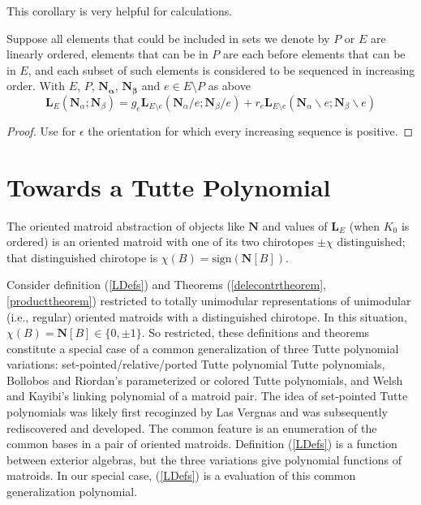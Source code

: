 \documentclass[Unicode]{cedram-alco}
\newcommand{\ext}[1]{\ensuremath{\mathbf{#1}}}
\newcommand{\eNal}{\ensuremath{\ext{N}_{\alpha}}}
\newcommand{\eNbe}{\ensuremath{\ext{N}_\beta}}
\newcommand{\extLHorSub}[3]{\ext{L}_{#1}\left(  {#2}; {#3}  \right)}
\begin{document}
This corollary is very helpful for calculations.

\begin{coro}
  Suppose all elements that could be included in sets we denote by $P$ or $E$ are linearly ordered,
  elements that can be in $P$ are each before elements that can be in $E$,
  and each subset of such elements is considered to be sequenced in increasing order.  With
  $E$, $P$, $\ext{N_\alpha}$, $\ext{N_\beta}$ and $e\in E\setminus P$ as above
  \begin{equation}
       \extLHorSub{E}{\eNal}{\eNbe}=
      g_e\extLHorSub{E\setminus e}{\eNal/e}{\eNbe/e} +
      r_e\extLHorSub{E\setminus e}{\eNal\backslash e}{\eNbe\backslash e}
  \end{equation}
\end{coro}
\begin{proof}
  Use for $\epsilon$ the orientation for which every increasing sequence is positive.
\end{proof}

\section{Towards a Tutte Polynomial}\label{polys}


The oriented matroid abstraction of objects like $\ext{N}$ and values of $\ext{L}_E$
(when $K_0$ is ordered) is an oriented matroid with one of its two chirotopes $\pm \chi$ distinguished; that
distinguished chirotope is $\chi(B) = \text{sign}(\ext{N}[B])$.

Consider definition (\ref{LDefs}) and Theorems (\ref{delecontrtheorem},\ref{producttheorem})
restricted to totally unimodular representations of unimodular (i.e., regular) oriented matroids
with a distinguished chirotope.  In this situation,  $\chi(B) = \ext{N}[B]\in \{0,\pm 1\}$.
So restricted, these definitions and theorems constitute a special case
of a common generalization of three Tutte polynomial variations:
set-pointed/relative/ported Tutte polynomial
Tutte polynomials, 
Bollobos and Riordan's parameterized or colored Tutte polynomials\cite{BollobasRiordanTuttePolyColored},
and Welsh and Kayibi's linking
polynomial of a matroid pair\cite{WelshKayibiLinking}. The idea of set-pointed Tutte polynomials
was likely first recoginzed by Las Vergnas\cite{MR0419272}
and was subsequently rediscovered and developed\cite{sdcPorted,SetPointedLV,RelTuttePolyDiaoHetyei}.
The common feature is an enumeration
of the common bases in a pair of oriented matroids.  Definition (\ref{LDefs}) is a function between
exterior algebras, but the three variations give polynomial functions of matroids.  In our special
case, (\ref{LDefs}) is a evaluation of this common generalization polynomial. 
\end{document}
